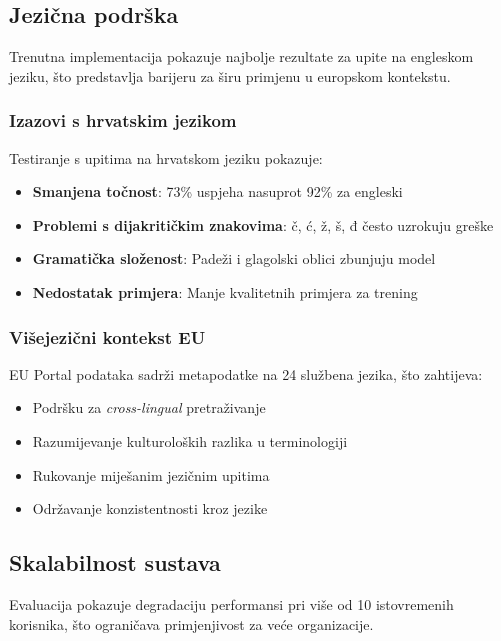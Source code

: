 \subsection{Jezična podrška}

Trenutna implementacija pokazuje najbolje rezultate za upite na engleskom jeziku, što predstavlja barijeru za širu primjenu u europskom kontekstu.

\subsubsection{Izazovi s hrvatskim jezikom}

Testiranje s upitima na hrvatskom jeziku pokazuje:

\begin{itemize}
    \item \textbf{Smanjena točnost}: 73\% uspjeha nasuprot 92\% za engleski
    \item \textbf{Problemi s dijakritičkim znakovima}: č, ć, ž, š, đ često uzrokuju greške
    \item \textbf{Gramatička složenost}: Padeži i glagolski oblici zbunjuju model
    \item \textbf{Nedostatak primjera}: Manje kvalitetnih primjera za trening
\end{itemize}

\subsubsection{Višejezični kontekst EU}

EU Portal podataka sadrži metapodatke na 24 službena jezika, što zahtijeva:

\begin{itemize}
    \item Podršku za \textit{cross-lingual} pretraživanje
    \item Razumijevanje kulturoloških razlika u terminologiji
    \item Rukovanje miješanim jezičnim upitima
    \item Održavanje konzistentnosti kroz jezike
\end{itemize}

\subsection{Skalabilnost sustava}

Evaluacija pokazuje degradaciju performansi pri više od 10 istovremenih korisnika, što ograničava primjenjivost za veće organizacije.

